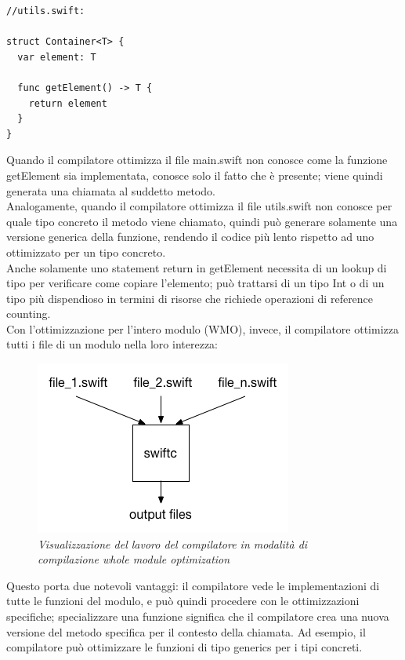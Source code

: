 \begin{lstlisting}
//utils.swift:

struct Container<T> {
  var element: T

  func getElement() -> T {
    return element
  }
}
\end{lstlisting}
Quando il compilatore ottimizza il file main.swift non conosce come la funzione getElement sia implementata, conosce solo il fatto che è presente; viene quindi generata una chiamata al suddetto metodo.\\
Analogamente, quando il compilatore ottimizza il file utils.swift non conosce per quale tipo concreto il metodo viene chiamato, quindi può generare solamente una versione generica della funzione, rendendo il codice più lento rispetto ad uno ottimizzato per un tipo concreto.\\
Anche solamente uno statement return in getElement necessita di un lookup di tipo per verificare come copiare l'elemento; può trattarsi di un tipo Int o di un tipo più dispendioso in termini di risorse che richiede operazioni di reference counting.\\
Con l'ottimizzazione per l'intero modulo (WMO), invece, il compilatore ottimizza tutti i file di un modulo nella loro interezza: 
\begin{figure}[H]
      \centering
      \includegraphics[scale=0.80]{immagini/wmo.png}
            \vspace{0.8cm}
            \caption{\textit{Visualizzazione del lavoro del compilatore in modalità di compilazione whole module optimization}}
\end{figure}
Questo porta due notevoli vantaggi: il compilatore vede le implementazioni di tutte le funzioni del modulo, e può quindi procedere con le ottimizzazioni specifiche; specializzare una funzione significa che il compilatore crea una nuova versione del metodo specifica per il contesto della chiamata. Ad esempio, il compilatore può ottimizzare le funzioni di tipo generics per i tipi concreti.\\
